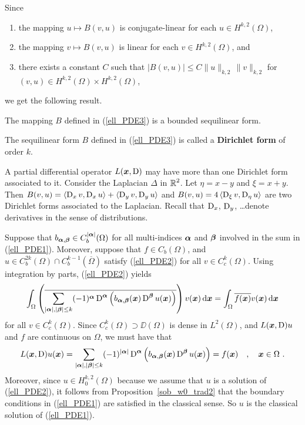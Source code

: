 Since
\begin{enumerate}
\item the mapping $u \mapsto B(v,u)$ is conjugate-linear for each
$u\in H^{k,2}(\Omega)$,
\item the mapping $v \mapsto B(v,u)$ is linear for each
$v\in H^{k,2}(\Omega)$, and
\item there exists a constant $C$ such that
$\displaystyle \left| B(v,u) \right| \leq C \| u\|_{k,2} \, \| v\|_{k,2}$
for $(v,u) \in H^{k,2}(\Omega) \times H^{k,2}(\Omega)$,
\end{enumerate}
we get the following result.

\begin{prop} \label{ell_Bblf}
The mapping $B$ defined in (\ref{ell_PDE3}) is a bounded sequilinear form.
\end{prop}

The sequilinear form $B$ defined in (\ref{ell_PDE3}) is
called a {\bfseries Dirichlet form} of order $k$.

\begin{rmk}
A partial differential operator $L({\bm{x}},\operatorname{D})$ may have more than one
Dirichlet form associated to it.  Consider the Laplacian
$\displaystyle \Delta$ in $\displaystyle \mathbb{R}^2$.  Let $\eta=x-y$ and
$\xi = x+y$.
Then $B(v,u) = \left\langle{\operatorname{D}_x v} , {\operatorname{D}_x u}\right\rangle + \left\langle{\operatorname{D}_y v} , {\operatorname{D}_y u}\right\rangle$ and
$B(v,u) = 4\left\langle{\operatorname{D}_\xi v} , {\operatorname{D}_\eta u}\right\rangle$ are two Dirichlet forms associated
to the Laplacian.  Recall that $\operatorname{D}_x$, $\operatorname{D}_y$, \ldots denote derivatives
in the sense of distributions.
\end{rmk}

Suppose that $\displaystyle b_{{\bm{\alpha}},{\bm{\beta}}}\in
C^{|{\bm{\alpha}}|}_b(\Omega)$
for all multi-indices ${\bm{\alpha}}$ and ${\bm{\beta}}$ involved in the sum in
(\ref{ell_PDE1}).  Moreover, suppose that $f\in C_b(\Omega)$, and
$\displaystyle u \in C^{2k}_b(\Omega)\cap C^{k-1}_b(\overline{\Omega})$
satisfy (\ref{ell_PDE2}) for all $\displaystyle v \in C^{k}_c(\Omega)$.  Using
integration by parts, (\ref{ell_PDE2}) yields
\[
\int_\Omega \left( \overline{\sum_{|{\bm{\alpha}}|,|{\bm{\beta}}|\leq k}
(-1)^{{\bm{\alpha}}} \operatorname{D}^{{\bm{\alpha}}}
\left( b_{{\bm{\alpha}},{\bm{\beta}}}({\bm{x}}) \operatorname{D}^{{\bm{\beta}}}
u({\bm{x}})\right)}\right)
v({\bm{x}}) \,\mathrm{d}{{\bm{x}}} = \int_\Omega \overline{f({\bm{x}})} v({\bm{x}})
\,\mathrm{d}{{\bm{x}}}
\]
for all $\displaystyle v \in C^{k}_c(\Omega)$.
Since $\displaystyle C^{k}_c(\Omega) \supset \DD(\Omega)$ is
dense in $\displaystyle L^2(\Omega)$, and $L({\bm{x}},\operatorname{D})u$ and $f$
are continuous on $\Omega$, we must have that
\[
L({\bm{x}},\operatorname{D})u({\bm{x}}) =
\sum_{|{\bm{\alpha}}|,|{\bm{\beta}}|\leq k} (-1)^{|{\bm{\alpha}}|} \operatorname{D}^{{\bm{\alpha}}}
\left( b_{{\bm{\alpha}},{\bm{\beta}}}({\bm{x}}) \operatorname{D}^{{\bm{\beta}}}
u({\bm{x}})\right) = f({\bm{x}})
\quad , \quad {\bm{x}} \in \Omega \ .
\]
Moreover, since $\displaystyle u \in H^{k,2}_0(\Omega)$ because we assume that
$u$ is a solution of (\ref{ell_PDE2}), it follows from
Proposition~\ref{sob_w0_trad2} that the boundary
conditions in (\ref{ell_PDE1}) are satisfied in the classical sense.
So $u$ is the classical solution of (\ref{ell_PDE1}).

